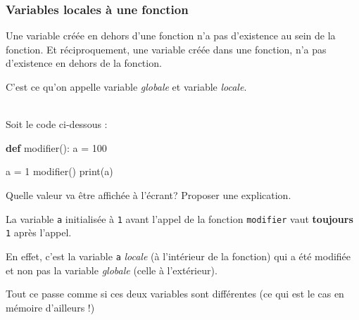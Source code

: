 \documentclass[a4paper,17pt]{extarticle}
\newenvironment{eleve}%
{\begin{activite}\color{noiramu}\\[-0.5cm]}
{\end{activite}}
\newenvironment{Shaded}{}{}
\newcommand{\KeywordTok}[1]{\textcolor[rgb]{0.00,0.44,0.13}{\textbf{{#1}}}}
\newcommand{\DecValTok}[1]{\textcolor[rgb]{0.25,0.63,0.44}{{#1}}}
\newcommand{\NormalTok}[1]{{#1}}
\newcommand{\OperatorTok}[1]{\textcolor[rgb]{0.40,0.40,0.40}{{#1}}}
\newcommand{\BuiltInTok}[1]{{#1}}
\begin{document}
    \hypertarget{variables-locales-uxe0-une-fonction}{%
\subsubsection{Variables locales à une
fonction}\label{variables-locales-uxe0-une-fonction}}

    Une variable créée en dehors d'une fonction n'a pas d'existence au sein
de la fonction. Et réciproquement, une variable créée dans une fonction,
n'a pas d'existence en dehors de la fonction.

C'est ce qu'on appelle variable \emph{globale} et variable
\emph{locale}.
\begin{eleve}
    Soit le code ci-dessous :

\begin{Shaded}
\begin{Highlighting}[]
\KeywordTok{def}\NormalTok{ modifier():}
\NormalTok{    a }\OperatorTok{=} \DecValTok{100}

\NormalTok{a }\OperatorTok{=} \DecValTok{1}
\NormalTok{modifier()}
\BuiltInTok{print}\NormalTok{(a)}
\end{Highlighting}
\end{Shaded}

Quelle valeur va être affichée à l'écrant? Proposer une explication.
        
        \end{eleve}\begin{reponse}
    La variable \texttt{a} initialisée à \texttt{1} avant l'appel de la
fonction \texttt{modifier} vaut \textbf{toujours} \texttt{1} après
l'appel.

En effet, c'est la variable \texttt{a} \emph{locale} (à l'intérieur de
la fonction) qui a été modifiée et non pas la variable \emph{globale}
(celle à l'extérieur).

Tout ce passe comme si ces deux variables sont différentes (ce qui est
le cas en mémoire d'ailleurs !)


\end{reponse}
\end{document}
